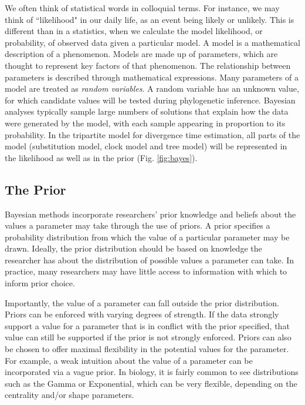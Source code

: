 We often think of statistical words in colloquial terms.
For instance, we may think of ``likelihood" in our daily life, as an event being likely or unlikely. 
This is different than in a statistics, when we calculate the model likelihood, or probability, of observed data given a particular model.
A model is a mathematical description of a phenomenon.
Models are made up of parameters, which are thought to represent key factors of that phenomenon.
The relationship between parameters is described through mathematical expressions.
Many parameters of a model are treated as \textit{random variables}.
A random variable has an unknown value, for which candidate values will be tested during phylogenetic inference. 
Bayesian analyses typically sample large numbers of solutions that explain how the data were generated by the model, with each sample appearing in proportion to its probability.
In the tripartite model for divergence time estimation, all parts of the model (substitution model, clock model and tree model) will be represented in the likelihood as well as in the prior (Fig. \ref{fig:bayes}).


\subsection{The Prior}


Bayesian methods incorporate researchers' prior knowledge and beliefs about the values a parameter may take through the use of priors.
A prior specifies a probability distribution from which the value of a particular parameter may be drawn.
Ideally, the prior distribution should be based on knowledge the researcher has about the distribution of possible values a parameter can take.
In practice, many researchers  may have little access to information with which to inform prior choice.

Importantly, the value of a parameter can fall outside the prior distribution.
Priors can be enforced with varying degrees of strength.
If the data strongly support a value for a parameter that is in conflict with the prior specified, that value can still be supported if the prior is not strongly enforced.
Priors can also be chosen to offer maximal flexibility in the potential values for the parameter.
For example, a weak intuition about the value of a parameter can be incorporated via a vague prior.
In biology, it is fairly common to see distributions such as the Gamma or Exponential, which can be very flexible, depending on the centrality and/or shape parameters.

